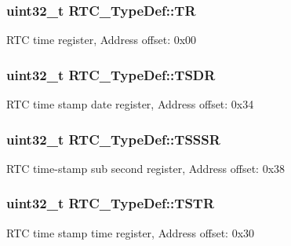 \subsubsection[{\texorpdfstring{TR}{TR}}]{ uint32\+\_\+t R\+T\+C\+\_\+\+Type\+Def\+::\+TR}\hypertarget{struct_r_t_c___type_def_a2e8783857f8644a4eb80ebc51e1cba42}{}\label{struct_r_t_c___type_def_a2e8783857f8644a4eb80ebc51e1cba42}
R\+TC time register, Address offset\+: 0x00 
\subsubsection[{\texorpdfstring{T\+S\+DR}{TSDR}}]{ uint32\+\_\+t R\+T\+C\+\_\+\+Type\+Def\+::\+T\+S\+DR}\hypertarget{struct_r_t_c___type_def_aa4633dbcdb5dd41a714020903fd67c82}{}\label{struct_r_t_c___type_def_aa4633dbcdb5dd41a714020903fd67c82}
R\+TC time stamp date register, Address offset\+: 0x34 
\subsubsection[{\texorpdfstring{T\+S\+S\+SR}{TSSSR}}]{ uint32\+\_\+t R\+T\+C\+\_\+\+Type\+Def\+::\+T\+S\+S\+SR}\hypertarget{struct_r_t_c___type_def_a1e8b4b987496ee1c0c6f16b0a94ea1a1}{}\label{struct_r_t_c___type_def_a1e8b4b987496ee1c0c6f16b0a94ea1a1}
R\+TC time-\/stamp sub second register, Address offset\+: 0x38 
\subsubsection[{\texorpdfstring{T\+S\+TR}{TSTR}}]{ uint32\+\_\+t R\+T\+C\+\_\+\+Type\+Def\+::\+T\+S\+TR}\hypertarget{struct_r_t_c___type_def_a1ddbb2a5eaa54ff43835026dec99ae1c}{}\label{struct_r_t_c___type_def_a1ddbb2a5eaa54ff43835026dec99ae1c}
R\+TC time stamp time register, Address offset\+: 0x30 
